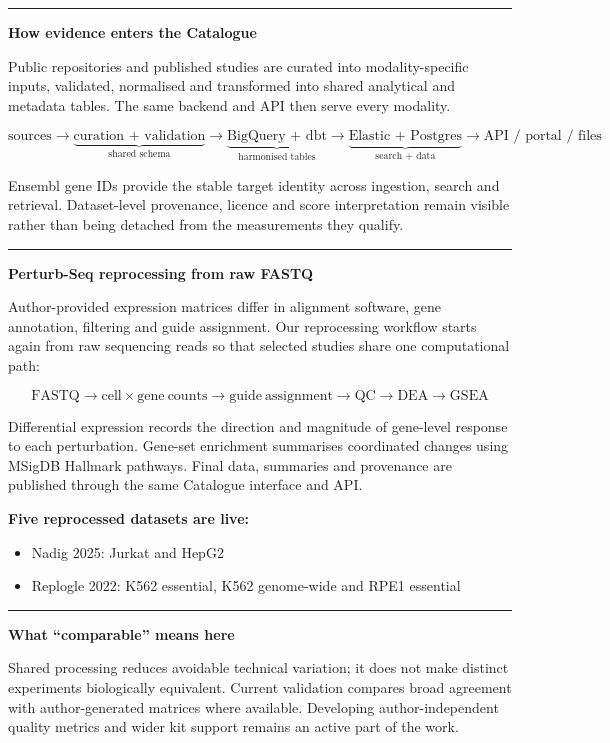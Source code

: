 \documentclass[20pt]{extarticle}
\newcommand{\sectiontitle}[2]{%
  \vspace{4mm}%
  {\color{#1}\rule{\linewidth}{1.6mm}}\par\vspace{2mm}%
  {\fontsize{39}{43}\selectfont\bfseries #2}\par\vspace{3mm}}
\newcommand{\bodycopy}{\fontsize{24}{30}\selectfont}
\newcommand{\smallcopy}{\fontsize{20}{25}\selectfont}
\begin{document}
\hfill
\begin{minipage}[t]{0.355\linewidth}
  \sectiontitle{Cyan}{How evidence enters the Catalogue}
  {\bodycopy
  Public repositories and published studies are curated into modality-specific inputs, validated, normalised and transformed
  into shared analytical and metadata tables. The same backend and API then serve every modality.}

  \vspace{4mm}
  {\fontsize{19}{24}\selectfont
  \[
    \text{sources}
    \longrightarrow \underbrace{\text{curation + validation}}_{\text{shared schema}}
    \longrightarrow \underbrace{\text{BigQuery + dbt}}_{\text{harmonised tables}}
    \longrightarrow \underbrace{\text{Elastic + Postgres}}_{\text{search + data}}
    \longrightarrow \text{API / portal / files}
  \]}

  {\bodycopy
  Ensembl gene IDs provide the stable target identity across ingestion, search and retrieval. Dataset-level provenance,
  licence and score interpretation remain visible rather than being detached from the measurements they qualify.}

  \sectiontitle{Orange}{Perturb-Seq reprocessing from raw FASTQ}
  {\bodycopy
  Author-provided expression matrices differ in alignment software, gene annotation, filtering and guide assignment.
  Our reprocessing workflow starts again from raw sequencing reads so that selected studies share one computational path:}

  \vspace{3mm}
  {\fontsize{22}{27}\selectfont\bfseries\color{Paper}
  \[
  \mathrm{FASTQ}
  \rightarrow \mathrm{cell\!\times\!gene\ counts}
  \rightarrow \mathrm{guide\ assignment}
  \rightarrow \mathrm{QC}
  \rightarrow \mathrm{DEA}
  \rightarrow \mathrm{GSEA}
  \]}

  {\bodycopy
  Differential expression records the direction and magnitude of gene-level response to each perturbation. Gene-set
  enrichment summarises coordinated changes using MSigDB Hallmark pathways. Final data, summaries and provenance are
  published through the same Catalogue interface and API.}

  \vspace{2mm}
  {\fontsize{19}{24}\selectfont\bfseries\color{Lime}Five reprocessed datasets are live:}
  {\smallcopy
  \begin{itemize}[leftmargin=8mm,itemsep=1mm,topsep=2mm]
    \item Nadig 2025: Jurkat and HepG2
    \item Replogle 2022: K562 essential, K562 genome-wide and RPE1 essential
  \end{itemize}}

  \sectiontitle{Magenta}{What “comparable” means here}
  {\bodycopy
  Shared processing reduces avoidable technical variation; it does not make distinct experiments biologically equivalent.
  Current validation compares broad agreement with author-generated matrices where available. Developing author-independent
  quality metrics and wider kit support remains an active part of the work.}
\end{minipage}
\end{document}
